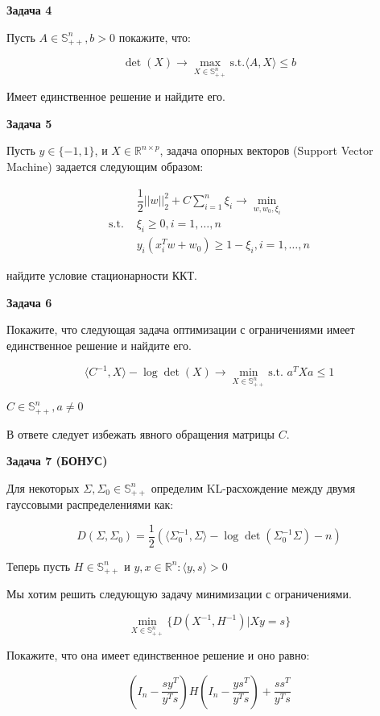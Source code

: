 \documentclass[
  russian,
  letterpaper,
  DIV=11,
  numbers=noendperiod]{scrartcl}
\begin{document}
\textbf{Задача 4}

Пусть \(A\in\mathbb{S}_{++}^{n}, b>0\) покажите, что:

\[ 
\det(X) \to \max\limits_{X\in\mathbb{S}^{n}_{++}} \text{s.t.} \langle A,X \rangle \leq b
\]

Имеет единственное решение и найдите его.

\textbf{Задача 5}

Пусть \(y \in \{-1, 1\}\), и \(X \in \mathbb{R}^{n \times p}\), задача
опорных векторов (Support Vector Machine) задается следующим образом:

\[
\begin{split}
& \dfrac{1}{2} ||w||_{2}^{2} + C \sum_{i=1}^{n} \xi_i \to \min_{w, w_0, \xi_i}\\
\text{s.t. } & \xi_i  \geq 0, i = 1,\ldots, n \\
& y_i (x_i^{T} w + w_0) \geq 1 - \xi_i, i = 1,\ldots, n 
\end{split}
\]

найдите условие стационарности ККТ.

\textbf{Задача 6}

Покажите, что следующая задача оптимизации с ограничениями имеет
единственное решение и найдите его.

\[
\langle C^{-1}, X\rangle - \log \det(X) \to \min\limits_{X \in \mathbb{S}_{++}^{n}} \text{s.t. } a^T X a \leq 1 
\]

\(C\in\mathbb{S}_{++}^n, a\neq 0\)

В ответе следует избежать явного обращения матрицы \(C\).

\textbf{Задача 7 (БОНУС)}

Для некоторых \(\Sigma,\Sigma_0\in\mathbb{S}^{n}_{++}\) определим
KL-расхождение между двумя гауссовыми распределениями как:

\[
D(\Sigma, \Sigma_0) = \dfrac{1}{2}(\langle \Sigma^{-1}_{0}, \Sigma \rangle - \log \det(\Sigma^{-1}_{0}\Sigma) - n)
\]

Теперь пусть \(H\in\mathbb{S}^{n}_{++}\) и
\(y,x \in \mathbb{R}^{n} : \langle y,s \rangle > 0\)

Мы хотим решить следующую задачу минимизации с ограничениями.

\[
\min\limits_{X\in\mathbb{S}^{n}_{++}} \{D(X^{-1}, H^{-1}) | Xy=s\}
\]

Покажите, что она имеет единственное решение и оно равно:

\[
(I_n - \dfrac{sy^T}{y^{T}s})H(I_n - \dfrac{ys^{T}}{y^{T}s}) + \dfrac{ss^T}{y^{T}s}
\]
\end{document}
